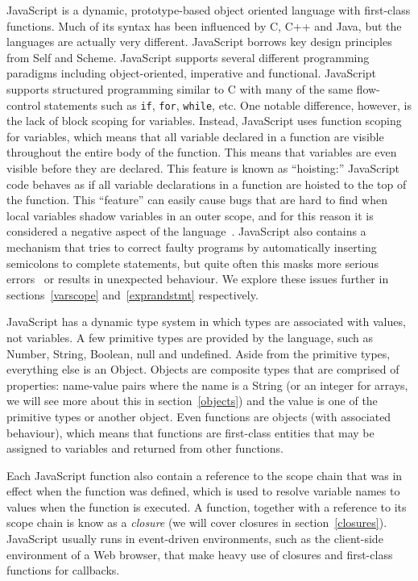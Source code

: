 JavaScript is a dynamic, prototype-based object oriented language with first-class
functions. Much of its syntax has been influenced by C, C++ and Java, but
the languages are actually very different. JavaScript borrows key design principles
from Self and Scheme. JavaScript supports several different programming
paradigms including object-oriented, imperative and functional. JavaScript supports
structured programming similar to C with many of the same flow-control statements
such as \texttt{if}, \texttt{for}, \texttt{while}, etc. One notable difference,
however, is the lack of block scoping for variables. Instead, JavaScript 
uses function scoping
for variables, which means that all variable declared in a function are
visible throughout the entire body of the function. This means that 
variables are even visible before they are declared. This feature 
is known as ``hoisting:'' JavaScript code behaves as if all variable 
declarations in a function are hoisted to the top of the function. This ``feature''
can easily cause bugs that are hard to find when local variables shadow variables in
an outer scope, and for this reason it is considered a negative aspect of the 
language~\cite{goodparts}. JavaScript also contains a mechanism that tries to
correct faulty programs by automatically inserting semicolons to complete statements, but quite
often this masks more serious errors~\cite{goodparts} or results in unexpected behaviour.
We explore these issues further in sections~\ref{varscope} and~\ref{exprandstmt} respectively.

JavaScript has a dynamic type system in which types are associated with values,
not variables. A few primitive types are provided by the language, such
as Number, String, Boolean, null and undefined. Aside from the primitive types,
everything else is an Object. Objects are composite types
that are comprised of properties: name-value pairs where the name is a String
(or an integer for arrays, we will see more about this in section~\ref{objects})
and the value is one of the primitive types or another object. Even functions
are objects (with associated behaviour), which means that functions are first-class
entities that may be assigned to variables and returned from other functions.

Each JavaScript function also contain a reference to the scope chain that was
in effect when the function was defined, which is used to resolve variable
names to values when the function is executed. A function, together with a
reference to its scope chain is know as a \emph{closure} (we will cover closures
in section~\ref{closures}). 
JavaScript usually runs in event-driven environments, such as the client-side
environment of a Web browser, that make heavy use of closures and first-class 
functions for callbacks.

